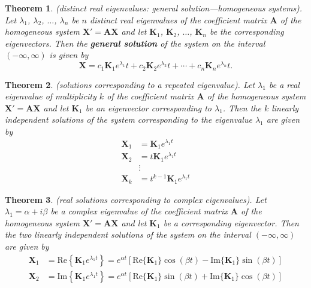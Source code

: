 \documentclass{article}
\theoremstyle{plain}
\newtheorem{thm}{Theorem}[section]
\theoremstyle{definition}
\theoremstyle{remark}
\begin{document}
\begin{thm} (distinct real eigenvalues: general solution—homogeneous systems).
    Let \(\lambda_1\), \(\lambda_2\), \(\ldots\), \(\lambda_n\) be \(n\) distinct real eigenvalues of the coefficient matrix \(\mathbf{A}\) of the homogeneous system \(\mathbf{X'} = \mathbf{AX}\) and let \(\mathbf{K}_1\), \(\mathbf{K}_2\), \(\ldots\), \(\mathbf{K}_n\) be the corresponding eigenvectors. Then the \textbf{general solution} of the system on the interval \((-\infty, \infty)\) is given by
    \begin{equation}
        \mathbf{X} = c_1\mathbf{K}_1 e^{\lambda_1}t + c_2\mathbf{K}_2 e^{\lambda_2}t + \cdots + c_n\mathbf{K}_n e^{\lambda_n}t.
    \end{equation}
\end{thm}

\begin{thm} (solutions corresponding to a repeated eigenvalue).
    Let \(\lambda_1\) be a real eigenvalue of multiplicity \(k\) of the coefficient matrix \(\mathbf{A}\) of the homogeneous system \(\mathbf{X'} = \mathbf{AX}\) and let \(\mathbf{K}_1\) be an eigenvector corresponding to \(\lambda_1\). Then the \(k\) linearly independent solutions of the system corresponding to the eigenvalue \(\lambda_1\) are given by
    \begin{align}
        \mathbf{X}_1 &= \mathbf{K}_1 e^{\lambda_1 t}\\
        \mathbf{X}_2 &= t\mathbf{K}_1 e^{\lambda_1 t}\\
        &\vdots\\
        \mathbf{X}_k &= t^{k-1} \mathbf{K}_1 e^{\lambda_1 t}
    \end{align}
\end{thm}

\begin{thm} (real solutions corresponding to complex eigenvalues).
    Let \(\lambda_1 = \alpha + i\beta\) be a complex eigenvalue of the coefficient matrix \(\mathbf{A}\) of the homogeneous system \(\mathbf{X'} = \mathbf{AX}\) and let \(\mathbf{K}_1\) be a corresponding eigenvector. Then the two linearly independent solutions of the system on the interval \((-\infty, \infty)\) are given by
    \begin{align}
        \mathbf{X}_1 &= \text{Re} \left\{\mathbf{K}_1 e^{\lambda_1 t}\right\} = e^{\alpha t} \left[\text{Re} \{\mathbf{K}_1\} \cos(\beta t) - \text{Im} \{\mathbf{K}_1\} \sin(\beta t)\right]\\
        \mathbf{X}_2 &= \text{Im} \left\{\mathbf{K}_1 e^{\lambda_1 t}\right\} = e^{\alpha t} \left[\text{Re} \{\mathbf{K}_1\} \sin(\beta t) + \text{Im} \{\mathbf{K}_1\} \cos(\beta t)\right]
    \end{align}
\end{thm}
\end{document}
